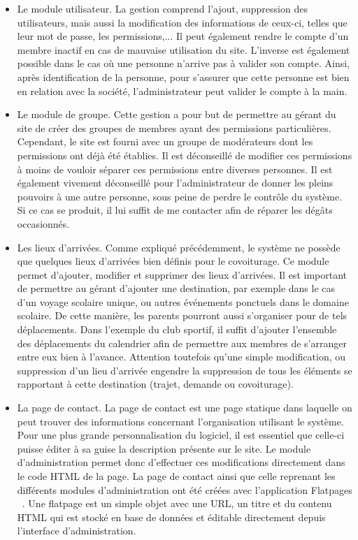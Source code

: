 \documentclass[12pt, a4paper, oneside]{article}
\begin{document}
    \begin{itemize}
        \item Le module utilisateur. La gestion comprend l'ajout, suppression des utilisateurs, mais aussi la modification des informations de ceux-ci, telles que leur mot de passe, les permissions,... Il peut également rendre le compte d'un membre inactif en cas de mauvaise utilisation du site. L'inverse est également possible dans le cas où une personne n'arrive pas à valider son compte. Ainsi, après identification de la personne, pour s'assurer que cette personne est bien en relation avec la société, l'administrateur peut valider le compte à la main.\\
        \item Le module de groupe. Cette gestion a pour but de permettre au gérant du site de créer des groupes de membres ayant des permissions particulières. Cependant, le site est fourni avec un groupe de modérateurs dont les permissions ont déjà été établies. Il est déconseillé de modifier ces permissions à moins de vouloir séparer ces permissions entre diverses personnes. Il est également vivement déconseillé pour l'administrateur de donner les pleins pouvoirs à une autre personne, sous peine de perdre le contrôle du système. Si ce cas se produit, il lui suffit de me contacter afin de réparer les dégâts occasionnés.\\
        \item Les lieux d'arrivées. Comme expliqué précédemment, le système ne possède que quelques lieux d'arrivées bien définis pour le covoiturage. Ce module permet d'ajouter, modifier et supprimer des lieux d'arrivées. Il est important de permettre au gérant d'ajouter une destination, par exemple dans le cas d'un voyage scolaire unique, ou autres événements ponctuels dans le domaine scolaire. De cette manière, les parents pourront aussi s'organiser pour de tels déplacements. Dans l'exemple du club sportif, il suffit d'ajouter l'ensemble des déplacements du calendrier afin de permettre aux membres de s'arranger entre eux bien à l'avance. Attention toutefois qu'une simple modification, ou suppression d'un lieu d'arrivée engendre la suppression de tous les éléments se rapportant à cette destination (trajet, demande ou covoiturage).\\
        \item La page de contact. La page de contact est une page statique dans laquelle on peut trouver des informations concernant l'organisation utilisant le système. Pour une plus grande personnalisation du logiciel, il est essentiel que celle-ci puisse éditer à sa guise la description présente sur le site. Le module d'administration permet donc d'effectuer ces modifications directement dans le code HTML de la page. La page de contact ainsi que celle reprenant les différents modules d'administration ont été créées avec l'application Flatpages ~\cite{django-flatpage}. Une flatpage est un simple objet avec une URL, un titre et du contenu HTML qui est stocké en base de données et éditable directement depuis l'interface d'administration.\\

\end{itemize}
\end{document}
